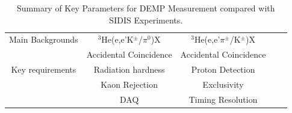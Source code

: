 \begin{table}
\begin{tabular}{|c|c|c|c|c|}
Main Backgrounds           & $\mathrm{^{3}He}$(e,e'K$^\pm$/$\pi^{0}$)X            &$\mathrm{^{3}He}$(e,e'$\pi^{\pm}$/K$^\pm$)X  \\
                           &   Accidental Coincidence & Accidental Coincidence	\\\hline
Key requirements           &  Radiation hardness      & Proton Detection	\\
                           &  Kaon Rejection          & Exclusivity	\\
                           &  DAQ                     &    Timing Resolution   \\
                        \hline
\end{tabular}
\caption{\footnotesize{Summary of Key Parameters for DEMP Measurement compared
    with SIDIS Experiments.}}\label{table:program_summary}
\label{table:key_par_sidis_dvcs}
\end{table} 

